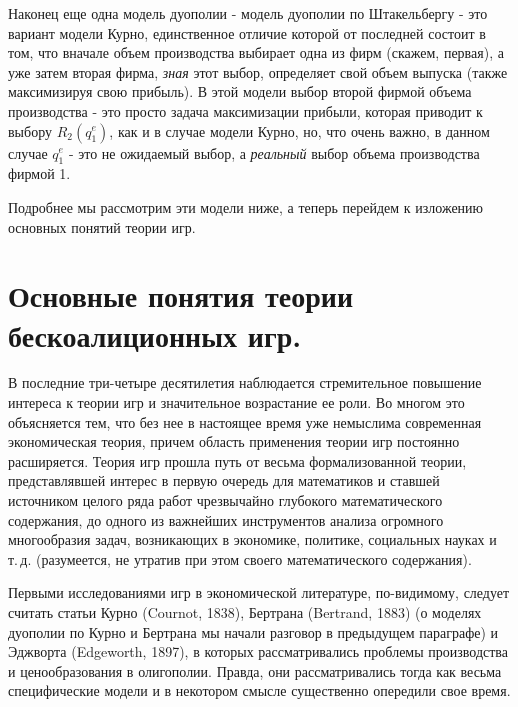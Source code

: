 \documentclass[12pt]{article}
\begin{document}
Наконец еще одна модель дуополии - модель дуополии по Штакельбергу -
это вариант модели Курно, единственное отличие которой от последней
состоит в том, что вначале объем производства выбирает одна из фирм
(скажем, первая), а уже затем вторая фирма, \emph{зная} этот выбор,
определяет свой объем выпуска (также максимизируя свою прибыль). В
этой модели выбор второй фирмой объема производства - это просто
задача максимизации прибыли, которая приводит к выбору $R_2(q^e_1)$,
как и в случае модели Курно, но, что очень важно, в данном случае
$q^e_1$ - это не ожидаемый выбор, а \emph{реальный} выбор объема
производства фирмой 1.

Подробнее мы рассмотрим эти модели ниже, а теперь
перейдем к изложению основных понятий теории игр.


\section{Основные понятия теории бескоалиционных игр.}

В последние три-четыре десятилетия наблюдается стремительное повышение
интереса к теории игр и значительное возрастание ее роли. Во многом
это объясняется тем, что без нее в настоящее время уже немыслима
современная экономическая теория, причем область применения теории
игр постоянно расширяется. Теория игр прошла путь от весьма
формализованной теории, представлявшей интерес в первую очередь для
математиков и ставшей источником целого ряда работ чрезвычайно
глубокого математического содержания, до одного из важнейших
инструментов анализа огромного многообразия задач, возникающих в
экономике, политике, социальных науках и т.\,д. (разумеется, не
утратив при этом своего математического содержания).
\smallskip

Первыми исследованиями игр в экономической литературе, по-видимому,
следует считать статьи Курно (Cournot, 1838), Бертрана (Bertrand,
1883) (о моделях дуополии по Курно и Бертрана мы начали разговор в
предыдущем параграфе) и Эджворта (Edgeworth, 1897), в которых
рассматривались проблемы производства и ценообразования в
олигополии. Правда, они рассматривались тогда как весьма
специфические модели и в некотором смысле существенно опередили свое
время.
\end{document}
